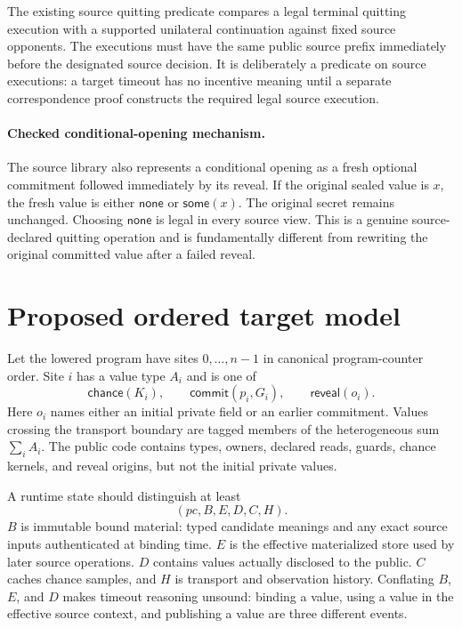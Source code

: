 \documentclass[11pt]{article}
\newcommand{\Some}{\mathsf{some}}
\newcommand{\None}{\mathsf{none}}
\begin{document}
The existing source quitting predicate compares a legal terminal quitting
execution with a supported unilateral continuation against fixed source
opponents.  The executions must have the same public source prefix immediately
before the designated source decision.  It is deliberately a predicate on
source executions: a target timeout has no incentive meaning until a separate
correspondence proof constructs the required legal source execution.

\paragraph{Checked conditional-opening mechanism.}
The source library also represents a conditional opening as a fresh optional
commitment followed immediately by its reveal.  If the original sealed value
is $x$, the fresh value is either $\None$ or $\Some(x)$.  The original secret
remains unchanged.  Choosing $\None$ is legal in every source view.  This is a
genuine source-declared quitting operation and is fundamentally different from
rewriting the original committed value after a failed reveal.

\section{Proposed ordered target model}

Let the lowered program have sites $0,\ldots,n-1$ in canonical program-counter
order.  Site $i$ has a value type $A_i$ and is one of
\[
  \mathsf{chance}(K_i),\qquad
  \mathsf{commit}(p_i,G_i),\qquad
  \mathsf{reveal}(o_i).
\]
Here $o_i$ names either an initial private field or an earlier commitment.
Values crossing the transport boundary are tagged members of the heterogeneous
sum $\sum_i A_i$.  The public code contains types, owners, declared reads,
guards, chance kernels, and reveal origins, but not the initial private values.

A runtime state should distinguish at least
\[
 (pc,B,E,D,C,H).
\]
$B$ is immutable bound material: typed candidate meanings and any exact source
inputs authenticated at binding time.  $E$ is the effective materialized store
used by later source operations.  $D$ contains values actually disclosed to
the public.  $C$ caches chance samples, and $H$ is transport and observation
history.  Conflating $B$, $E$, and $D$ makes timeout reasoning unsound: binding
a value, using a value in the effective source context, and publishing a value
are three different events.
\end{document}
